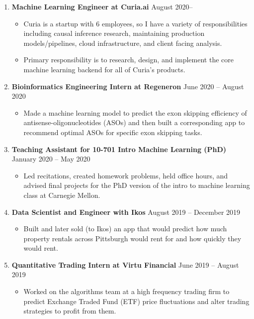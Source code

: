 \documentclass[letterpaper,11pt]{article}
\newcommand{\resitem}[1]{\item #1 \vspace{-2pt}}
\begin{document}
\vspace{-6pt}
\begin{enumerate}[leftmargin=10pt]
	\item[] \textbf{Machine Learning Engineer at \textcolor{myGreen}{Curia.ai}} \cftdotfill{\cftdotsep} August 2020--\\
	\vspace{-4pt}	
	\begin{itemize}
		\resitem{Curia is a startup with 6 employees, so I have a variety of responsibilities including causal inference research, maintaining production models/pipelines, cloud infrastructure, and client facing analysis.}
		\resitem{Primary responsibility is to research, design, and implement the core machine learning backend for all of Curia's products.}
	\end{itemize}
	 
	\item[] \textbf{Bioinformatics Engineering Intern at \textcolor{myGreen}{Regeneron}} \cftdotfill{\cftdotsep} June 2020 -- August 2020\\
	\vspace{-4pt}	
	\begin{itemize}
		\resitem{Made a machine learning model to predict the exon skipping efficiency of antisense-oligonucleotides (ASOs) and then built a corresponding app to recommend optimal ASOs for specific exon skipping tasks.}	
	\end{itemize}

	\item[] \textbf{Teaching Assistant for \textcolor{myGreen}{10-701 Intro Machine Learning (PhD)}} \cftdotfill{\cftdotsep} January 2020 -- May 2020\\
	\vspace{-4pt}
	\begin{itemize}
		\resitem{Led recitations, created homework problems, held office hours, and advised final projects for the PhD version of the intro to machine learning class at Carnegie Mellon.}
	\end{itemize}

	\item[] \textbf{Data Scientist and Engineer with \textcolor{myGreen}{Ikos}} \cftdotfill{\cftdotsep} August 2019 -- December 2019\\
	\vspace{-4pt}	
	\begin{itemize}
		\resitem{Built and later sold (to Ikos) an app that would predict how much property rentals across Pittsburgh would rent for and how quickly they would rent.}	
	\end{itemize}
	
	\item[] \textbf{Quantitative Trading Intern at \textcolor{myGreen}{Virtu Financial}} \cftdotfill{\cftdotsep} June 2019 -- August 2019\\
	\vspace{-4pt}
	\begin{itemize}
		\resitem{Worked on the algorithms team at a high frequency trading firm to predict Exchange Traded Fund (ETF) price fluctuations and alter trading strategies to profit from them.}
	\end{itemize}
\end{enumerate}
\end{document}
